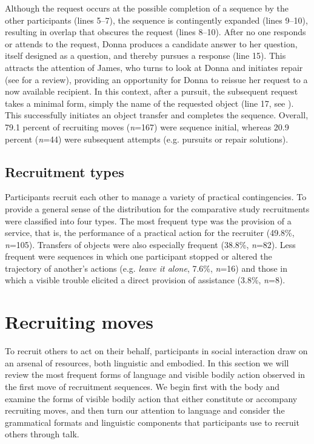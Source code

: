 \documentclass[output=paper,nonflat,modfont,draft]{langsci/langscibook}
\begin{document}
Although the request occurs at the possible completion of a sequence by the other participants (lines 5--7), the sequence is contingently expanded (lines 9--10), resulting in overlap that obscures the request (lines 8--10). After no one responds or attends to the request, Donna produces a candidate answer to her question, itself designed as a question, and thereby pursues a response (line 15). This attracts the attention of James, who turns to look at Donna and initiates repair (see \citealt{Kendrick2015} for a review), providing an opportunity for Donna to reissue her request to a now available recipient. In this context, after a pursuit, the subsequent request takes a minimal form, simply the name of the requested object (line 17, see ). This successfully initiates an object transfer and completes the sequence. Overall, 79.1 percent of recruiting moves (\textit{n}=167) were sequence initial, whereas 20.9 percent (\textit{n}=44) were subsequent attempts (e.g. pursuits or repair solutions).

\subsection{Recruitment types}
Participants recruit each other to manage a variety of practical contingencies. To provide a general sense of the distribution for the comparative study recruitments were classified into four types. The most frequent type was the provision of a service, that is, the performance of a practical action for the recruiter (49.8\%, \textit{n}=105). Transfers of objects were also especially frequent (38.8\%, \textit{n}=82). Less frequent were sequences in which one participant stopped or altered the trajectory of another’s actions (e.g. \textit{leave it alone}, 7.6\%, \textit{n}=16) and those in which a visible trouble elicited a direct provision of assistance (3.8\%, \textit{n}=8).

\section{Recruiting moves}
\label{sec:kendrick:4}
To recruit others to act on their behalf, participants in social interaction draw on an arsenal of resources, both linguistic and embodied. In this section we will review the most frequent forms of language and visible bodily action observed in the first move of recruitment sequences. We begin first with the body and examine the forms of visible bodily action that either constitute or accompany recruiting moves, and then turn our attention to language and consider the grammatical formats and linguistic components that participants use to recruit others through talk.
\end{document}
